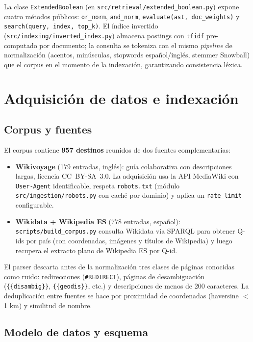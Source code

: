 \documentclass[runningheads,a4paper]{llncs}
\begin{document}
La clase \texttt{ExtendedBoolean} (en \texttt{src/retrieval/extended\_boolean.py}) expone cuatro m\'etodos p\'ublicos: \texttt{or\_norm}, \texttt{and\_norm}, \texttt{evaluate(ast, doc\_weights)} y \texttt{search(query, index, top\_k)}. El \'indice invertido (\texttt{src/indexing/inverted\_index.py}) almacena postings con \texttt{tf\textendash idf} pre-computado por documento; la consulta se tokeniza con el mismo \emph{pipeline} de normalizaci\'on (acentos, min\'usculas, stopwords espa\~nol/ingl\'es, stemmer Snowball) que el corpus en el momento de la indexaci\'on, garantizando consistencia l\'exica.

\section{Adquisici\'on de datos e indexaci\'on}

\subsection{Corpus y fuentes}

El corpus contiene \textbf{957 destinos} reunidos de dos fuentes complementarias:

\begin{itemize}
\item \textbf{Wikivoyage} (179 entradas, ingl\'es): gu\'ia colaborativa con descripciones largas, licencia CC~BY-SA~3.0. La adquisici\'on usa la API MediaWiki con \texttt{User-Agent} identificable, respeta \texttt{robots.txt} (m\'odulo \texttt{src/ingestion/robots.py} con cach\'e por dominio) y aplica un \texttt{rate\_limit} configurable.
\item \textbf{Wikidata + Wikipedia ES} (778 entradas, espa\~nol): \texttt{scripts/build\_corpus.py} consulta Wikidata v\'ia SPARQL para obtener Q-ids por pa\'is (con coordenadas, im\'agenes y t\'itulos de Wikipedia) y luego recupera el extracto plano de Wikipedia ES por Q-id.
\end{itemize}

El parser descarta antes de la normalizaci\'on tres clases de p\'aginas conocidas como ruido: redirecciones (\texttt{\#REDIRECT}), p\'aginas de desambiguaci\'on (\texttt{\{\{disambig\}\}}, \texttt{\{\{geodis\}\}}, etc.) y descripciones de menos de 200 caracteres. La deduplicaci\'on entre fuentes se hace por proximidad de coordenadas (haversine $<$ 1 km) y similitud de nombre.

\subsection{Modelo de datos y esquema}
\end{document}
